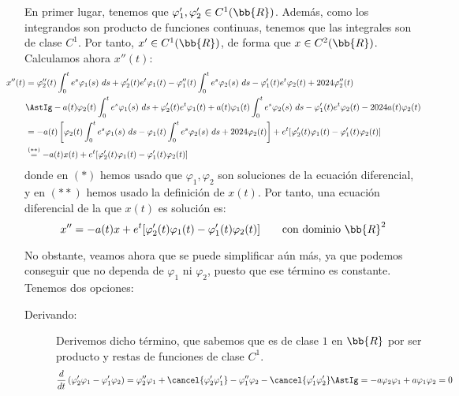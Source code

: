 \documentclass[12pt]{article}
\begin{document}
\begin{ejercicio}
        En primer lugar, tenemos que $\varphi_1',\varphi_2'\in C^1(\bb{R})$. Además, como los integrandos son producto de funciones continuas, tenemos que las integrales son de clase $C^1$. Por tanto, $x'\in C^1(\bb{R})$, de forma que $x\in C^2(\bb{R})$.
        Calculamos ahora $x''(t)$:
        \begin{align*}
            \hspace{-3cm}
            x''(t)&= \varphi_2''(t)\int_0^t e^{s}\varphi_1(s)~ds+\varphi_2'(t)e^{t}\varphi_1(t)-\varphi_1''(t)\int_0^t e^{s}\varphi_2(s)~ds-\varphi_1'(t)e^{t}\varphi_2(t)+2024\varphi_2''(t)\\
            &\AstIg -a(t)\varphi_2(t)\int_0^t e^{s}\varphi_1(s)~ds+\varphi_2'(t)e^{t}\varphi_1(t)+a(t)\varphi_1(t)\int_0^t e^{s}\varphi_2(s)~ds-\varphi_1'(t)e^{t}\varphi_2(t)-2024a(t)\varphi_2(t)\\
            &= -a(t)\left[\varphi_2(t)\int_0^t e^{s}\varphi_1(s)~ds-\varphi_1(t)\int_0^t e^{s}\varphi_2(s)~ds+2024\varphi_2(t)\right] + e^t[\varphi_2'(t)\varphi_1(t)-\varphi_1'(t)\varphi_2(t)]\\
            &\stackrel{(\ast\ast)}{=} -a(t)x(t) + e^t[\varphi_2'(t)\varphi_1(t)-\varphi_1'(t)\varphi_2(t)]
        \end{align*}
        donde en $(\ast)$ hemos usado que $\varphi_1,\varphi_2$ son soluciones de la ecuación diferencial, y en $(\ast\ast)$ hemos usado la definición de $x(t)$.
        Por tanto, una ecuación diferencial de la que $x(t)$ es solución es:
        \begin{equation*}
            x''=-a(t)x+e^t[\varphi_2'(t)\varphi_1(t)-\varphi_1'(t)\varphi_2(t)]\qquad \text{con dominio }\bb{R}^2
        \end{equation*}

        No obstante, veamos ahora que se puede simplificar aún más, ya que podemos conseguir que no dependa de $\varphi_1$ ni $\varphi_2$, puesto que ese término es constante.
        Tenemos dos opciones:
        \begin{description}
            \item[Derivando:]
            
            Derivemos dicho término, que sabemos que es de clase $1$ en $\bb{R}$ por ser producto y restas de funciones de clase $C^1$.
            \begin{equation*}
                \dfrac{d}{dt}\left(\varphi_2'\varphi_1-\varphi_1'\varphi_2\right)
                = \varphi_2''\varphi_1+\cancel{\varphi_2'\varphi_1'}-\varphi_1''\varphi_2-\cancel{\varphi_1'\varphi_2'}
                \AstIg
                = -a\varphi_2\varphi_1 + a\varphi_1\varphi_2=0
            \end{equation*}


\end{description}
\end{ejercicio}
\end{document}
